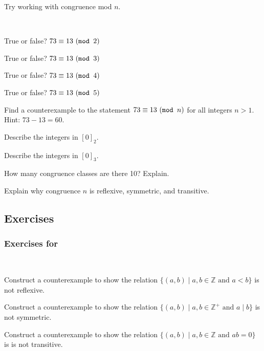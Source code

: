 Try working with congruence mod $n$.

\begin{act}
\label{act_cong_modn}  
~
    \begin{actpart}
        \item  True or false?  $73 \equiv 13 ~(\texttt{mod } 2)$
        \item  True or false?  $73 \equiv 13 ~(\texttt{mod } 3)$
        \item  True or false?  $73 \equiv 13 ~(\texttt{mod } 4)$
        \item  True or false?  $73 \equiv 13 ~(\texttt{mod } 5)$
        \item  Find a counterexample to the statement $73 \equiv 13 ~(\texttt{mod } n)$ for all integers $n >1$.  Hint: $73-13=60$.
        \item Describe the integers in $[0]_2$.
        \item Describe the integers in $[0]_3$.
        \item How many congruence classes are there  10?  Explain.
        \item Explain why congruence  $n$ is reflexive, symmetric, and transitive.
    \end{actpart}
\end{act}


\subsection{Exercises}


\subsubsection*{Exercises for 
\subrelppty}

\begin{exer}[\exerP] %
\label{exer_Cex_rel_on_integers}
~
    \begin{exerpart}
        \item Construct a counterexample to show the relation $\{ (a,b) \mid a, b  \in \mathbb{Z} \text{ and } a < b \}$ is not reflexive.
        \item Construct a counterexample to show the relation $\{ (a,b) \mid a, b  \in \mathbb{Z}^+ \text{ and } a \mid b \}$ is not symmetric. 
        \item Construct a counterexample to show the relation $\{ (a,b) \mid a, b  \in \mathbb{Z} \text{ and } ab = 0 \}$ is is not transitive.
    \end{exerpart}
\end{exer}

